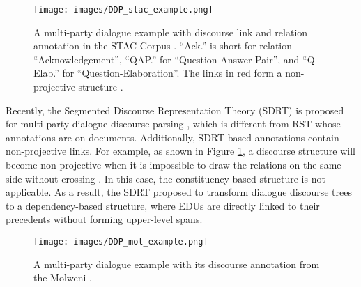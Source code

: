 \documentclass[11pt]{article}
\begin{document}
\begin{figure}[t!]
    \begin{center}
    \texttt{[image: images/DDP\_stac\_example.png]}
    \end{center}
    \caption{A multi-party dialogue example \cite{shi2019deepSeqParser} with discourse link and relation annotation in the STAC Corpus \cite{asher2016STAC}. ``Ack.'' is short for relation ``Acknowledgement'', ``QAP.'' for ``Question-Answer-Pair'', and ``Q-Elab.'' for ``Question-Elaboration''. The links in red form a non-projective structure \cite{mcdonald2005non-projective}.}
    \label{fig:stac-example}
\vspace{-0.2cm}
\end{figure}

Recently, the Segmented Discourse Representation Theory (SDRT) is proposed for multi-party dialogue discourse parsing \cite{asher2003logics,asher2016STAC}, which is different from RST whose annotations are on documents. Additionally, SDRT-based annotations contain non-projective links. For example, as shown in Figure \ref{fig:stac-example}, a discourse structure will become non-projective when it is impossible to draw the relations on the same side without crossing \cite{mcdonald2005non-projective}. In this case, the constituency-based structure is not applicable. As a result, the SDRT proposed to transform dialogue discourse trees to a dependency-based structure, where EDUs are directly linked to their precedents without forming upper-level spans.

\begin{figure}[t!]
    \begin{center}
    \texttt{[image: images/DDP\_mol\_example.png]}
    \end{center}
     \caption{A multi-party dialogue example with its discourse annotation from the Molweni \cite{li2020molweni}.}
    \label{fig:mol-example}
\end{figure}
\end{document}
